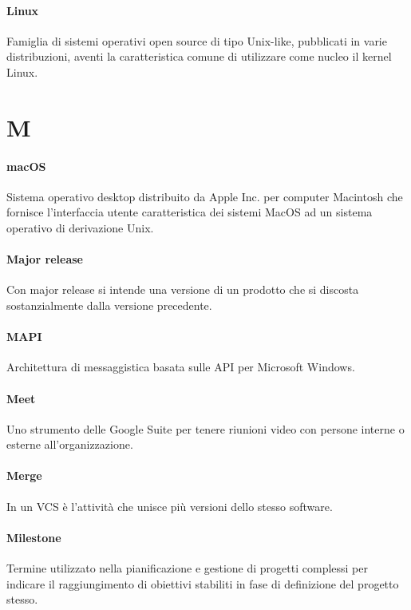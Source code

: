 \documentclass[]{article}
\begin{document}
	\paragraph*{Linux}
	Famiglia di sistemi operativi open source di tipo Unix-like, pubblicati in varie distribuzioni, aventi la caratteristica comune di utilizzare come nucleo il kernel Linux.

	\newpage

	\section*{M}

	\paragraph*{macOS}
	Sistema operativo desktop distribuito da Apple Inc. per	computer Macintosh che fornisce l'interfaccia utente caratteristica dei sistemi	MacOS ad un sistema operativo di derivazione Unix.

	\paragraph*{Major release}
	Con major release si intende una versione di un prodotto che si discosta sostanzialmente dalla versione precedente.

	\paragraph*{MAPI}
	Architettura di messaggistica basata sulle API per Microsoft Windows.

	\paragraph*{Meet}
	Uno strumento delle Google Suite per tenere riunioni video con persone interne o esterne all'organizzazione.

	\paragraph*{Merge}
	In un VCS è l'attività che unisce più versioni dello stesso software.

	\paragraph*{Milestone}
	Termine utilizzato nella pianificazione e gestione di progetti complessi per indicare il raggiungimento di obiettivi stabiliti in fase di definizione del progetto stesso.
\end{document}

